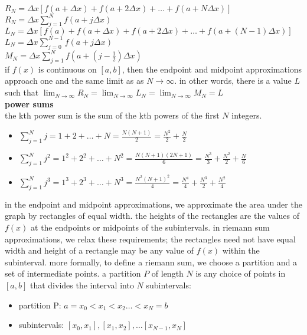 \documentclass{article}
\begin{document}
$R_N = \Delta x[f(a + \Delta x) + f(a + 2\Delta x) + \ldots + f(a + N\Delta x)]$\\
$R_N = \Delta x\sum_{j=1}^{N}f(a + j\Delta x)$\\
$L_N = \Delta x[f(a) + f(a + \Delta x) + f(a + 2\Delta x) + \ldots + f(a + (N -1)\Delta x)]$\\
$L_N = \Delta x\sum_{j=0}^{N-1}f(a + j\Delta x)$\\
$M_N = \Delta x\sum_{j=1}^{N}f(a + (j - \frac{1}{2})\Delta x)$\\

if $f(x)$ is continuous on $[a, b]$, then the endpoint and midpoint approximations approach one and the same limit as as $N \to \infty$. in other words, there is a value $L$ such that $\lim_{N \to \infty}R_N = \lim_{N \to \infty}L_N = \lim_{N \to \infty}M_N = L$\\

\textbf{power sums}\\
the kth power sum is the sum of the kth powers of the first $N$ integers.\\
	\begin{itemize}
		\item $\sum_{j=1}^{N}j = 1 + 2 + \ldots + N = \frac{N(N + 1)}{2} = \frac{N^2}{2} + \frac{N}{2}$
		\item $\sum_{j=1}^{N}j^2 = 1^2 + 2^2 + \ldots + N^2 = \frac{N(N + 1)(2N + 1)}{6} = \frac{N^3}{3} + \frac{N^2}{2} + \frac{N}{6}$ 
		\item $\sum_{j=1}^{N}j^3 = 1^3 + 2^3 + \ldots + N^3 = \frac{N^2(N + 1)^2}{4} = \frac{N^4}{4} + \frac{N^3}{2} + \frac{N^2}{4}$ 
	\end{itemize}

in the endpoint and midpoint approximations, we approximate the area under the graph by rectangles of equal width. the heights of the rectangles are the values of $f(x)$ at the endpoints or midpoints of the subintervals. in riemann sum approximations, we relax these requirements; the rectangles need not have equal width and height of a rectangle may be any value of $f(x)$ within the subinterval. more formally, to define a riemann sum, we choose a partition and a set of intermediate points. a partition $P$ of length $N$ is any choice of points in $[a, b]$ that divides the interval into $N$ subintervals:
	\begin{itemize}
		\item partition P: $a = x_0 < x_1 < x_2 \ldots < x_N = b$
		\item subintervals: $[x_0, x_1], [x_1, x_2], \ldots [x_{N-1}, x_{N}]$
	\end{itemize}
\end{document}

